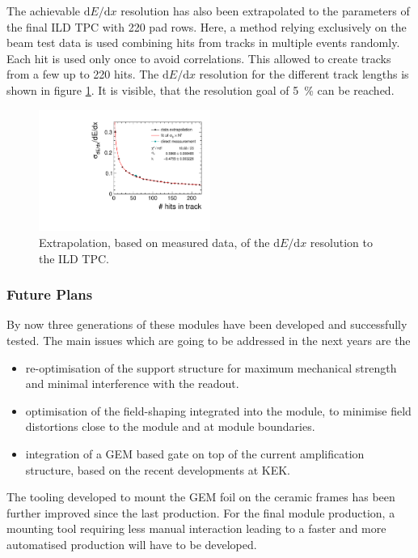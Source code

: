 The achievable \ensuremath{\mathrm{d}E/\mathrm{d}x} resolution has also been extrapolated to the parameters of the final ILD TPC with \num{220} pad rows.
Here, a method relying exclusively on the beam test data is used combining hits from tracks in multiple events randomly.
Each hit is used only once to avoid correlations.
This allowed to create tracks from a few up to 220 hits.
The \ensuremath{\mathrm{d}E/\mathrm{d}x} resolution for the different track lengths is shown in figure \ref{sfig:dedx_reso_ILD}.
It is visible, that the resolution goal of \SI{5}{\percent} can be reached.

\begin{figure}[tbhp!]
  \centering
\includegraphics[width=0.5\textwidth]{Tracker/TPC_Bonn/plots/TPC-DG_dEdxResVSHits_fitPar.pdf}
\caption{Extrapolation, based on measured data,  of the \ensuremath{\mathrm{d}E/\mathrm{d}x} resolution to the ILD TPC.}
\label{fig:dedx_est}
\label{sfig:dedx_reso_ILD}
\end{figure}


\subsubsection{Future Plans}

By now three generations of these modules have been developed and successfully tested. The main issues which are going to be addressed in the next years are the
\begin{itemize}
\item re-optimisation of the support structure for maximum mechanical strength and minimal interference with the readout.
\item optimisation of the field-shaping integrated into the module, to minimise field distortions close to the module and at module boundaries.
\item integration of a GEM based gate on top of the current amplification structure, based on the recent developments at KEK.
\end{itemize}
The tooling developed to mount the GEM foil on the ceramic frames has been further improved since the last production. 
For the final module production, a mounting tool requiring less manual interaction leading to a faster and more automatised production will have to be developed.

